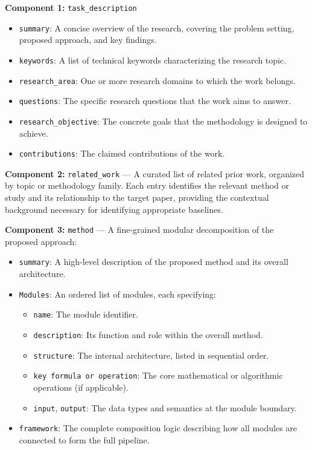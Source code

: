 \begin{tcolorbox}[
	title={Box 2: Input Schema — Research Task Specification},
	colback=blue!3!white,
	colframe=blue!30!black,
	colbacktitle=blue!15!white,
	coltitle=black,
	fonttitle=\bfseries,
	arc=3mm,
	boxrule=0.8pt,
	breakable
]
\small
\textbf{Component 1:} \texttt{task\_description}
\begin{itemize}[nosep,leftmargin=12pt]
	\item \texttt{summary}: A concise overview of the research, covering the problem setting, proposed approach, and key findings.
	\item \texttt{keywords}: A list of technical keywords characterizing the research topic.
	\item \texttt{research\_area}: One or more research domains to which the work belongs.
	\item \texttt{questions}: The specific research questions that the work aims to answer.
	\item \texttt{research\_objective}: The concrete goals that the methodology is designed to achieve.
	\item \texttt{contributions}: The claimed contributions of the work.
\end{itemize}
\medskip

\textbf{Component 2:} \texttt{related\_work} — A curated list of related prior work, organized by topic or methodology family. Each entry identifies the relevant method or study and its relationship to the target paper, providing the contextual background necessary for identifying appropriate baselines.

\medskip

\textbf{Component 3:} \texttt{method} — A fine-grained modular decomposition of the proposed approach:
\begin{itemize}[nosep,leftmargin=12pt]
	\item \texttt{summary}: A high-level description of the proposed method and its overall architecture.
	\item \texttt{Modules}: An ordered list of modules, each specifying:
	\begin{itemize}[nosep,leftmargin=16pt]
		\item \texttt{name}: The module identifier.
		\item \texttt{description}: Its function and role within the overall method.
		\item \texttt{structure}: The internal architecture, listed in sequential order.
		\item \texttt{key formula or operation}: The core mathematical or algorithmic operations (if applicable).
		\item \texttt{input}, \texttt{output}: The data types and semantics at the module boundary.
	\end{itemize}
	\item \texttt{framework}: The complete composition logic describing how all modules are connected to form the full pipeline.
\end{itemize}
\medskip


\end{tcolorbox}
